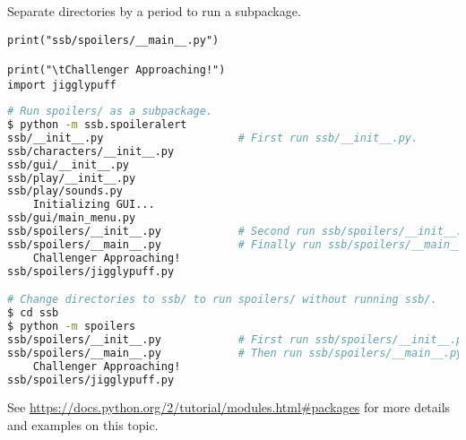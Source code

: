 Separate directories by a period to run a subpackage.

\begin{lstlisting}
print("ssb/spoilers/__main__.py")

print("\tChallenger Approaching!")
import jigglypuff
\end{lstlisting}

\begin{lstlisting}[language=bash]
# Run spoilers/ as a subpackage.
$ python -m ssb.spoileralert
ssb/__init__.py                     # First run ssb/__init__.py.
ssb/characters/__init__.py
ssb/gui/__init__.py
ssb/play/__init__.py
ssb/play/sounds.py
    Initializing GUI...
ssb/gui/main_menu.py
ssb/spoilers/__init__.py            # Second run ssb/spoilers/__init__.py.
ssb/spoilers/__main__.py            # Finally run ssb/spoilers/__main__.py.
    Challenger Approaching!
ssb/spoilers/jigglypuff.py

# Change directories to ssb/ to run spoilers/ without running ssb/.
$ cd ssb
$ python -m spoilers
ssb/spoilers/__init__.py            # First run ssb/spoilers/__init__.py.
ssb/spoilers/__main__.py            # Then run ssb/spoilers/__main__.py.
    Challenger Approaching!
ssb/spoilers/jigglypuff.py
\end{lstlisting}

See \url{https://docs.python.org/2/tutorial/modules.html\#packages} for more details and examples on this topic.

